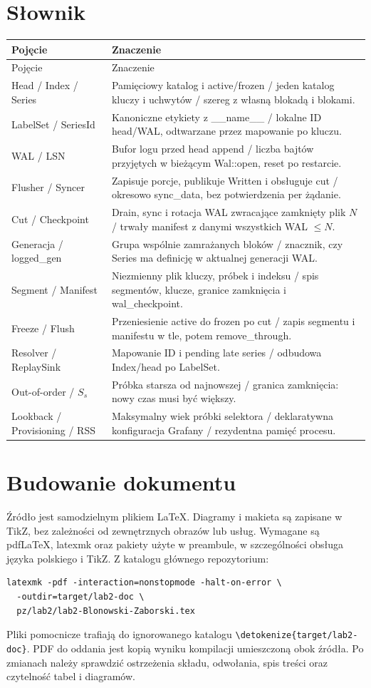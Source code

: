 \documentclass[11pt,a4paper]{article}
\newcommand{\code}[1]{\expandafter\nolinkurl\expandafter{\detokenize{#1}}}
\newcommand{\tabhead}[1]{\toprule #1\\ \midrule\endfirsthead
  \toprule #1\\ \midrule\endhead \bottomrule\endfoot}
\begin{document}
\appendix
\section{Słownik}
\begin{longtable}{P{32mm}P{124mm}}
\tabhead{Pojęcie & Znaczenie}
Head / Index / Series & Pamięciowy katalog i active/frozen /
jeden katalog kluczy i uchwytów / szereg z własną blokadą i blokami.\\
LabelSet / SeriesId & Kanoniczne etykiety z \_\_name\_\_ /
lokalne ID head/WAL, odtwarzane przez mapowanie po kluczu.\\
WAL / LSN & Bufor logu przed head append /
liczba bajtów przyjętych w bieżącym Wal::open, reset po restarcie.\\
Flusher / Syncer & Zapisuje porcje, publikuje Written i obsługuje cut /
okresowo sync\_data, bez potwierdzenia per żądanie.\\
Cut / Checkpoint & Drain, sync i rotacja WAL zwracające zamknięty plik $N$ /
trwały manifest z danymi wszystkich WAL $\leq N$.\\
Generacja / logged\_gen & Grupa wspólnie zamrażanych bloków /
znacznik, czy Series ma definicję w aktualnej generacji WAL.\\
Segment / Manifest & Niezmienny plik kluczy, próbek i indeksu /
spis segmentów, klucze, granice zamknięcia i wal\_checkpoint.\\
Freeze / Flush & Przeniesienie active do frozen po cut /
zapis segmentu i manifestu w tle, potem remove\_through.\\
Resolver / ReplaySink & Mapowanie ID i pending late series /
odbudowa Index/head po LabelSet.\\
Out-of-order / $S_s$ & Próbka starsza od najnowszej /
granica zamknięcia: nowy czas musi być większy.\\
Lookback / Provisioning / RSS & Maksymalny wiek próbki selektora /
deklaratywna konfiguracja Grafany / rezydentna pamięć procesu.\\
\end{longtable}

\section{Budowanie dokumentu}
Źródło jest samodzielnym plikiem LaTeX. Diagramy i makieta są zapisane
w TikZ, bez zależności od zewnętrznych obrazów lub usług.
Wymagane są pdfLaTeX, latexmk oraz pakiety użyte w preambule,
w szczególności obsługa języka polskiego i TikZ.
Z katalogu głównego repozytorium:
\begin{lstlisting}
latexmk -pdf -interaction=nonstopmode -halt-on-error \
  -outdir=target/lab2-doc \
  pz/lab2/lab2-Blonowski-Zaborski.tex
\end{lstlisting}
Pliki pomocnicze trafiają do ignorowanego katalogu \code{target/lab2-doc}.
PDF do oddania jest kopią wyniku kompilacji umieszczoną obok źródła.
Po zmianach należy sprawdzić ostrzeżenia składu, odwołania, spis treści
oraz czytelność tabel i diagramów.
\end{document}
